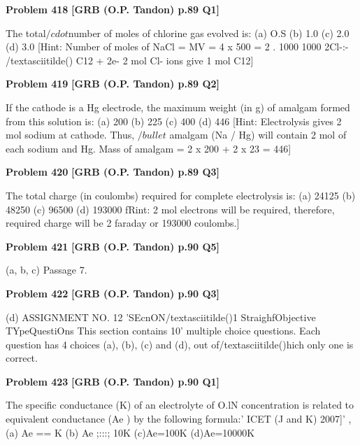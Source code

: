 \begin{problembox}
\textbf{Problem 418} \hfill \textbf{[GRB (O.P. Tandon) p.89 Q1]}
\label{q:ext-grb_all_questions-418}

The total$/cdot$number of moles of chlorine gas evolved is: 
(a) O.S 
(b) 1.0 
(c) 2.0 
(d) 3.0 
[Hint: 
Number of moles of NaCl = MV = 4 x 500 = 2 
. 
1000 
1000 
2Cl-:- /textasciitilde() 
C12 + 2e-
2 mol Cl- ions give 1 mol C12]
\end{problembox}

\begin{problembox}
\textbf{Problem 419} \hfill \textbf{[GRB (O.P. Tandon) p.89 Q2]}
\label{q:ext-grb_all_questions-419}

If the cathode is a Hg electrode, the maximum weight (in g) of 
amalgam formed from this solution is: 
(a) 200 
(b) 225 
(c) 400 
(d) 446 
[Hint: 
Electrolysis gives 2 mol sodium at cathode. Thus, $/bullet$ 
amalgam (Na / Hg) will contain 2 mol of each sodium and Hg. 
Mass of amalgam = 2 x 200 + 2 x 23 = 446]
\end{problembox}

\begin{problembox}
\textbf{Problem 420} \hfill \textbf{[GRB (O.P. Tandon) p.89 Q3]}
\label{q:ext-grb_all_questions-420}

The total charge (in coulombs) required for complete 
electrolysis is: 
(a) 24125 
(b) 48250 
(c) 96500 
(d) 193000 
fRint: 
2 mol electrons will be required, therefore, required 
charge will be 2 faraday or 193000 coulombs.]
\end{problembox}

\begin{problembox}
\textbf{Problem 421} \hfill \textbf{[GRB (O.P. Tandon) p.90 Q5]}
\label{q:ext-grb_all_questions-421}

(a, b, c) 
Passage 7.
\end{problembox}

\begin{problembox}
\textbf{Problem 422} \hfill \textbf{[GRB (O.P. Tandon) p.90 Q3]}
\label{q:ext-grb_all_questions-422}

(d) 
ASSIGNMENT NO. 12 
'SEcnON/textasciitilde()1 
StraighfObjective TYpeQuestiOns 
This section contains 10' multiple choice questions. Each 
question has 4 choices (a), (b), (c) and (d), out of/textasciitilde()hich only 
one is correct.
\end{problembox}

\begin{problembox}
\textbf{Problem 423} \hfill \textbf{[GRB (O.P. Tandon) p.90 Q1]}
\label{q:ext-grb_all_questions-423}

The specific conductance (K) of an electrolyte of O.lN 
concentration is related to equivalent conductance (Ae ) by the 
following formula:' 
ICET (J and K) 2007]' 
, (a) Ae == K 
(b) Ae ;:::; 10K 
(c)Ae=100K 
(d)Ae=10000K
\end{problembox}


